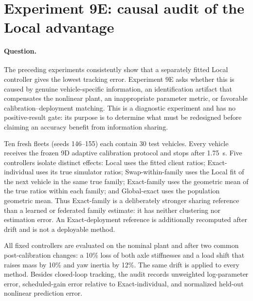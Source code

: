 \section{Experiment 9E: causal audit of the Local advantage}
\label{sec:experiment9e}

\paragraph{Question.}
The preceding experiments consistently show that a separately fitted Local
controller gives the lowest tracking error. Experiment 9E asks whether this is
caused by genuine vehicle-specific information, an identification artifact that
compensates the nonlinear plant, an inappropriate parameter metric, or favorable
calibration--deployment matching. This is a diagnostic experiment and has no
positive-result gate: its purpose is to determine what must be redesigned before
claiming an accuracy benefit from information sharing.

Ten fresh fleets (seeds 146--155) each contain 30 test vehicles. Every vehicle
receives the frozen 9D adaptive calibration protocol and stops after 1.75~s. Five
controllers isolate distinct effects: Local uses the fitted client ratios;
Exact-individual uses its true simulator ratios; Swap-within-family uses the
Local fit of the next vehicle in the same true family; Exact-family uses the
geometric mean of the true ratios within each family; and Global-exact uses the
population geometric mean. Thus Exact-family is a deliberately stronger sharing
reference than a learned or federated family estimate: it has neither clustering
nor estimation error. An Exact-deployment reference is additionally recomputed
after drift and is not a deployable method.

All fixed controllers are evaluated on the nominal plant and after two common
post-calibration changes: a 10\% loss of both axle stiffnesses and a load shift
that raises mass by 10\% and yaw inertia by 12\%. The same drift is applied to
every method. Besides closed-loop tracking, the audit records unweighted
log-parameter error, scheduled-gain error relative to Exact-individual, and
normalized held-out nonlinear prediction error.

